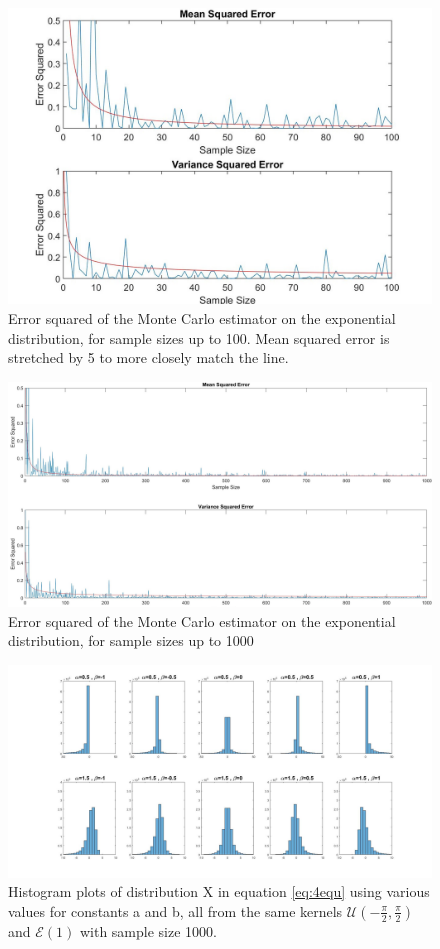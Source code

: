 \documentclass[twoside,twocolumn]{article}
\begin{document}
\begin{figure}[h]
  \centering
    \includegraphics[width=\linewidth]{3monte}
  \caption{Error squared of the Monte Carlo estimator on the exponential distribution, for sample sizes up to 100. Mean squared error is stretched by 5 to more closely match the line.}
  \label{fig:3monteg}
\end{figure}
\begin{figure}[h]
  \centering
    \includegraphics[width=\linewidth]{3ftr2}
  \caption{Error squared of the Monte Carlo estimator on the exponential distribution, for sample sizes up to 1000}
  \label{fig:3m2}
\end{figure}
\begin{figure}[h]
  \centering
    \includegraphics[width=\textwidth ]{4dist}
  \caption{Histogram plots of distribution X in equation \ref{eq:4equ} using various values for constants a and b, all from the same kernels $\mathcal{U}(-\frac{\pi}{2},\frac{\pi}{2})$ and $\mathcal{E}(1)$ with sample size 1000.}
  \label{fig:4dist}
\end{figure}
\end{document}
